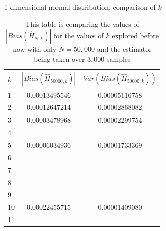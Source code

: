 \documentclass{report}
\begin{document}
\begin{table}
\caption{1-dimensional normal distribution, comparison of $k$} \label{normal_kcompare2_table}
\begin{center}
\begin{tabular}{| l | c c |} 
\toprule
$k$ &  $|Bias(\hat{H}_{50000, k})|$ & $Var(Bias(\hat{H}_{50000, k}))$ \\
\midrule[1pt]
1      & 0.00013495546     & 0.00005116758  \\
2      & 0.00012647214     & 0.00002868082  \\
3      & 0.00003478968     & 0.00002299754  \\
4      &   &      \\
5      & 0.00006034936     & 0.00001733369  \\
6      &   &      \\
7      &   &      \\
8      &   &      \\
9      &   &      \\
10    & 0.00022455715     & 0.00001409080  \\
11    &   &      \\
\hline
\end{tabular}
\\[10pt]
\caption*{This table is comparing the values of $|Bias(\hat{H}_{N, k})|$ for the values of $k$ explored before now with only $N=50,000$ and the estimator being taken over $3,000$ samples}
\end{center}
\end{table}
\end{document}
